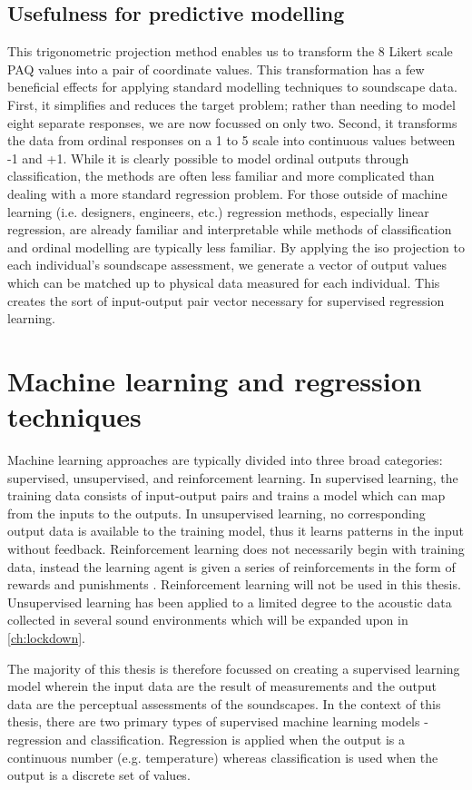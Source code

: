 \subsection{Usefulness for predictive modelling}
This trigonometric projection method enables us to transform the 8 Likert scale PAQ values into a pair of coordinate values. This transformation has a few beneficial effects for applying standard modelling techniques to soundscape data. First, it simplifies and reduces the target problem; rather than needing to model eight separate responses, we are now focussed on only two. Second, it transforms the data from ordinal responses on a 1 to 5 scale into continuous values between -1 and +1. While it is clearly possible to model ordinal outputs through classification, the methods are often less familiar and more complicated than dealing with a more standard regression problem. For those outside of machine learning (i.e. designers, engineers, etc.) regression methods, especially linear regression, are already familiar and interpretable while methods of classification and ordinal modelling are typically less familiar. By applying the \gls{iso} projection to each individual's soundscape assessment, we generate a vector of output values which can be matched up to physical data measured for each individual. This creates the sort of input-output pair vector necessary for supervised regression learning.

\section{Machine learning and regression techniques}
Machine learning approaches are typically divided into three broad categories: supervised, unsupervised, and reinforcement learning. In supervised learning, the training data consists of input-output pairs and trains a model which can map from the inputs to the outputs. In unsupervised learning, no corresponding output data is available to the training model, thus it learns patterns in the input without feedback. Reinforcement learning does not necessarily begin with training data, instead the learning agent is given a series of reinforcements in the form of rewards and punishments \citep{StuartRussell2021}. Reinforcement learning will not be used in this thesis. Unsupervised learning has been applied to a limited degree to the acoustic data collected in several sound environments which will be expanded upon in \cref{ch:lockdown}. 

The majority of this thesis is therefore focussed on creating a supervised learning model wherein the input data are the result of measurements and the output data are the perceptual assessments of the soundscapes. In the context of this thesis, there are two primary types of supervised machine learning models - regression and classification. Regression is applied when the output is a continuous number (e.g. temperature) whereas classification is used when the output is a discrete set of values. 



